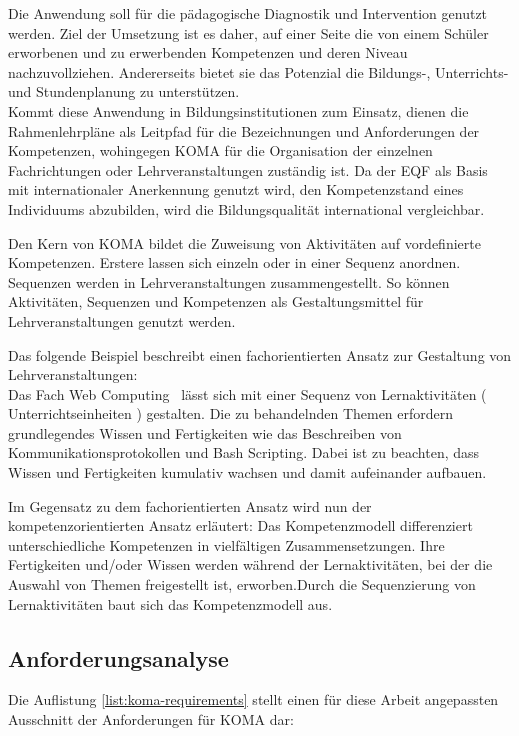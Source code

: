 \documentclass[
12pt,
english,
ngerman,
headsepline,
twoside,
openright,
numbers=noenddot,version=first
]{scrreprt}
\begin{document}
Die Anwendung soll für die pädagogische Diagnostik und Intervention genutzt werden.
Ziel der Umsetzung ist es daher, auf einer Seite die von einem Schüler erworbenen und zu erwerbenden Kompetenzen und deren Niveau nachzuvollziehen. Andererseits bietet sie das Potenzial die Bildungs-, Unterrichts- und Stundenplanung zu unterstützen.\\

Kommt diese Anwendung in Bildungsinstitutionen zum Einsatz, dienen die Rahmenlehrpläne als Leitpfad für die Bezeichnungen und Anforderungen der Kompetenzen, wohingegen \acrshort{KOMA} für die Organisation der einzelnen Fachrichtungen oder Lehrveranstaltungen zuständig ist. Da der \acrshort{EQF} als Basis mit internationaler Anerkennung genutzt wird, den Kompetenzstand eines Individuums abzubilden, wird die Bildungsqualität international vergleichbar.

Den Kern von \acrshort{KOMA} bildet die Zuweisung von Aktivitäten auf vordefinierte Kompetenzen. Erstere lassen sich einzeln oder in einer Sequenz anordnen. Sequenzen werden in Lehrveranstaltungen zusammengestellt. So können Aktivitäten, Sequenzen und Kompetenzen als Gestaltungsmittel für Lehrveranstaltungen genutzt werden. 


Das folgende Beispiel beschreibt einen fachorientierten Ansatz zur Gestaltung von Lehrveranstaltungen:\\
Das Fach \glqq Web Computing \grqq\ lässt sich mit einer Sequenz von Lernaktivitäten ( Unterrichtseinheiten ) gestalten. Die zu behandelnden Themen erfordern grundlegendes Wissen und Fertigkeiten wie das Beschreiben von Kommunikationsprotokollen und Bash Scripting. Dabei ist zu beachten, dass Wissen und Fertigkeiten kumulativ wachsen und damit aufeinander aufbauen.

Im Gegensatz zu dem fachorientierten Ansatz wird nun der kompetenzorientierten Ansatz erläutert:
Das Kompetenzmodell differenziert unterschiedliche Kompetenzen in vielfältigen Zusammensetzungen. Ihre Fertigkeiten und/oder Wissen werden während der  Lernaktivitäten, bei der die Auswahl von Themen freigestellt ist, erworben.Durch die Sequenzierung von Lernaktivitäten baut sich das Kompetenzmodell aus.


\subsection{Anforderungsanalyse}
Die Auflistung \ref{list:koma-requirements} stellt einen für diese Arbeit angepassten Ausschnitt der Anforderungen für \acrshort{KOMA} dar:
\end{document}

